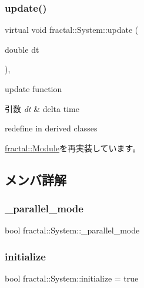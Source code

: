\subsubsection{\texorpdfstring{update()}{update()}}
{\footnotesize\ttfamily virtual void fractal\+::\+System\+::update (\begin{DoxyParamCaption}\item[{double}]{dt }\end{DoxyParamCaption})\hspace{0.3cm}{\ttfamily [inline]}, {\ttfamily [virtual]}}



update function 


\begin{DoxyParams}{引数}
{\em dt} & delta time\\
\hline
\end{DoxyParams}
redefine in derived classes 

\hyperlink{classfractal_1_1Module_ad68342ebc960bb0e1dd19b7c70bc3753}{fractal\+::\+Module}を再実装しています。



\subsection{メンバ詳解}
\mbox{\label{classfractal_1_1System_a740b45f120349f503425770aa3926863}} 
\subsubsection{\texorpdfstring{\+\_\+parallel\+\_\+mode}{\_parallel\_mode}}
{\footnotesize\ttfamily bool fractal\+::\+System\+::\+\_\+parallel\+\_\+mode\hspace{0.3cm}{\ttfamily [private]}}

\mbox{\label{classfractal_1_1System_aa14a55323502d83d3e2f949dd33e0747}} 
\subsubsection{\texorpdfstring{initialize}{initialize}}
{\footnotesize\ttfamily bool fractal\+::\+System\+::initialize = true\hspace{0.3cm}{\ttfamily [private]}}

